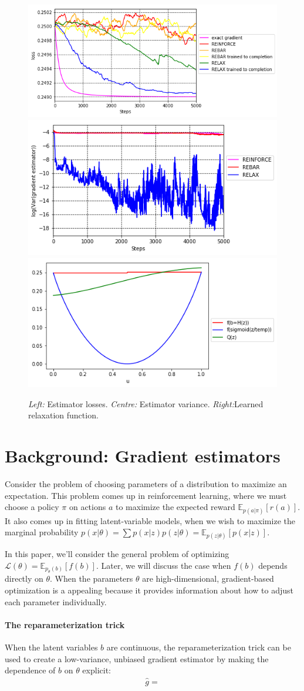 \documentclass{article}
\newcommand{\discreteDist}{p_{\theta}(b)}
\newcommand{\loss}{f(b)}
\newcommand{\expectedLoss}{\mathbb{E}_{\discreteDist{}}\left[ \loss{} \right]}
\begin{document}
\begin{figure}
\begin{center}
\includegraphics[width=.3\textwidth]{figures/losses}
\includegraphics[width=.3\textwidth]{figures/variance_no_opt}
\includegraphics[width=.3\textwidth]{figures/learned_r}
\label{first figure}
\end{center}
\caption{
\emph{Left:} Estimator losses.
\emph{Centre:} Estimator variance.
\emph{Right:}Learned relaxation function.
}
\end{figure}


\section{Background: Gradient estimators}
Consider the problem of choosing parameters of a distribution to maximize an expectation.
This problem comes up in reinforcement learning, where we must choose a policy $\pi$ on actions $a$ to maximize the expected reward $\mathbb{E}_{p(a|\pi)} \left[ r(a) \right]$.
It also comes up in fitting latent-variable models, when we wish to maximize the marginal probability $p(x|\theta) = \sum p(x|z) p(z|\theta) = \mathbb{E}_{p(z|\theta)} \left[ p(x|z) \right]$.

In this paper, we'll consider the general problem of optimizing $\mathcal{L}(\theta)=\expectedLoss{}$.
Later, we will discuss the case when $\loss{}$ depends directly on $\theta$.
When the parameters $\theta$ are high-dimensional, gradient-based optimization is a appealing because it provides information about how to adjust each parameter individually.

\paragraph{The reparameterization trick}
When the latent variables $b$ are continuous, the reparameterization trick can be used to create a low-variance, unbiased gradient estimator by making the dependence of $b$ on $\theta$ explicit:
\begin{align}
\hat g = 
\end{align}
\end{document}
